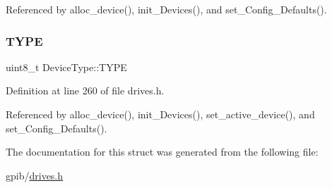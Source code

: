 Referenced by alloc\+\_\+device(), init\+\_\+\+Devices(), and set\+\_\+\+Config\+\_\+\+Defaults().

\mbox{\label{structDeviceType_acee5219162b6f47a9423b2086d127ede}} 
\subsubsection{\texorpdfstring{T\+Y\+PE}{TYPE}}
{\footnotesize\ttfamily uint8\+\_\+t Device\+Type\+::\+T\+Y\+PE}



Definition at line 260 of file drives.\+h.



Referenced by alloc\+\_\+device(), init\+\_\+\+Devices(), set\+\_\+active\+\_\+device(), and set\+\_\+\+Config\+\_\+\+Defaults().



The documentation for this struct was generated from the following file\+:\begin{DoxyCompactItemize}
\item 
gpib/\hyperlink{drives_8h}{drives.\+h}\end{DoxyCompactItemize}
